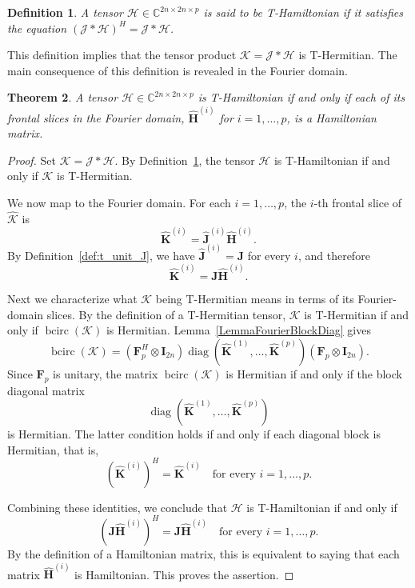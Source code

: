 \documentclass[pdflatex,sn-mathphys-ay]{sn-jnl}
\newcommand{\T}[1]{\mathcal{#1}}    %
\newcommand{\M}[1]{\bm{#1}}     %
\newcommand{\C}{\mathbb{C}}         %
\newcommand{\bcirc}{\operatorname{bcirc}}
\newcommand{\diag}{\operatorname{diag}}
\theoremstyle{thmstyleone}
\newtheorem{theorem}{Theorem}[section]
\theoremstyle{thmstyletwo}
\theoremstyle{thmstylethree}
\newtheorem{definition}[theorem]{Definition}
\numberwithin{equation}{section}
\begin{document}
\begin{definition}
\label{def:t_hamiltonian}
A tensor $\T{H} \in \C^{2n \times 2n \times p}$ is said to be \emph{T-Hamiltonian} if it satisfies the equation $(\T{J} * \T{H})^H = \T{J} * \T{H}$.
\end{definition}

This definition implies that the tensor product $\T{K} = \T{J} * \T{H}$ is T-Hermitian. 
The main consequence of this definition is revealed in the Fourier domain.

\begin{theorem}
\label{thm:hamiltonian_equiv}
A tensor $\T{H} \in \C^{2n \times 2n \times p}$ is T-Hamiltonian if and only if each of its frontal slices in the Fourier domain, $\widehat{\M{H}}^{(i)}$ for $i=1, \dots, p$, is a Hamiltonian matrix.
\end{theorem}
\begin{proof}
Set
$\T{K} = \T{J} * \T{H}$.
By Definition~\ref{def:t_hamiltonian}, the tensor $\T{H}$ is T-Hamiltonian if and only if $\T{K}$ is T-Hermitian.

We now map to the Fourier domain. For each $i=1,\dots,p$, the $i$-th frontal slice of $\widehat{\T{K}}$ is
$$
\widehat{\M{K}}^{(i)} = \widehat{\M{J}}^{(i)}\widehat{\M{H}}^{(i)}.
$$
By Definition~\ref{def:t_unit_J}, we have $\widehat{\M{J}}^{(i)} = \M{J}$ for every $i$, and therefore
$$
\widehat{\M{K}}^{(i)} = \M{J}\widehat{\M{H}}^{(i)}.
$$

Next we characterize what $\T{K}$ being T-Hermitian means in terms of its Fourier-domain slices. By the definition of a T-Hermitian tensor, $\T{K}$ is T-Hermitian if and only if $\bcirc(\T{K})$ is Hermitian. Lemma~\ref{LemmaFourierBlockDiag} gives
$$
\bcirc(\T{K}) = (\M{F}_{p}^H \otimes \M{I}_{2n})
\diag(\widehat{\M{K}}^{(1)},\dots,\widehat{\M{K}}^{(p)})
(\M{F}_{p} \otimes \M{I}_{2n}).
$$
Since $\M{F}_{p}$ is unitary, the matrix $\bcirc(\T{K})$ is Hermitian if and only if the block diagonal matrix
$$
\diag(\widehat{\M{K}}^{(1)},\dots,\widehat{\M{K}}^{(p)})
$$
is Hermitian. The latter condition holds if and only if each diagonal block is Hermitian, that is,
$$
(\widehat{\M{K}}^{(i)})^H = \widehat{\M{K}}^{(i)}
\quad \text{for every } i=1,\dots,p.
$$

Combining these identities, we conclude that $\T{H}$ is T-Hamiltonian if and only if
$$
(\M{J}\widehat{\M{H}}^{(i)})^H = \M{J}\widehat{\M{H}}^{(i)}
\quad \text{for every } i=1,\dots,p.
$$
By the definition of a Hamiltonian matrix, this is equivalent to saying that each matrix $\widehat{\M{H}}^{(i)}$ is Hamiltonian. This proves the assertion.
\end{proof}
\end{document}
